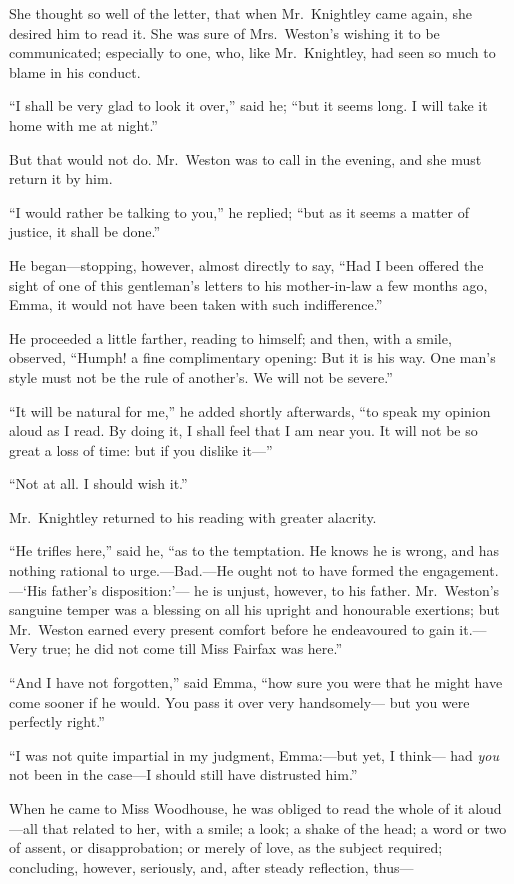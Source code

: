 She thought so well of the letter, that when Mr.\ Knightley came again,
she desired him to read it.  She was sure of Mrs.\ Weston's wishing
it to be communicated; especially to one, who, like Mr.\ Knightley,
had seen so much to blame in his conduct.

``I shall be very glad to look it over,'' said he; ``but it seems long.
I will take it home with me at night.''

But that would not do.  Mr.\ Weston was to call in the evening,
and she must return it by him.

``I would rather be talking to you,'' he replied; ``but as it seems
a matter of justice, it shall be done.''

He began---stopping, however, almost directly to say, ``Had I been offered
the sight of one of this gentleman's letters to his mother-in-law a few
months ago, Emma, it would not have been taken with such indifference.''

He proceeded a little farther, reading to himself; and then,
with a smile, observed, ``Humph! a fine complimentary opening:
But it is his way.  One man's style must not be the rule of another's.
We will not be severe.''

``It will be natural for me,'' he added shortly afterwards, ``to speak my
opinion aloud as I read.  By doing it, I shall feel that I am near you.
It will not be so great a loss of time:  but if you dislike it---''

``Not at all.  I should wish it.''

Mr.\ Knightley returned to his reading with greater alacrity.

``He trifles here,'' said he, ``as to the temptation.  He knows
he is wrong, and has nothing rational to urge.---Bad.---He ought
not to have formed the engagement.---`His father's disposition:'---%
he is unjust, however, to his father.  Mr.\ Weston's sanguine
temper was a blessing on all his upright and honourable exertions;
but Mr.\ Weston earned every present comfort before he endeavoured
to gain it.---Very true; he did not come till Miss Fairfax was here.''

``And I have not forgotten,'' said Emma, ``how sure you were that he
might have come sooner if he would.  You pass it over very handsomely---%
but you were perfectly right.''

``I was not quite impartial in my judgment, Emma:---but yet, I think---%
had \emph{you} not been in the case---I should still have distrusted him.''

When he came to Miss Woodhouse, he was obliged to read the whole
of it aloud---all that related to her, with a smile; a look;
a shake of the head; a word or two of assent, or disapprobation;
or merely of love, as the subject required; concluding, however,
seriously, and, after steady reflection, thus---%

